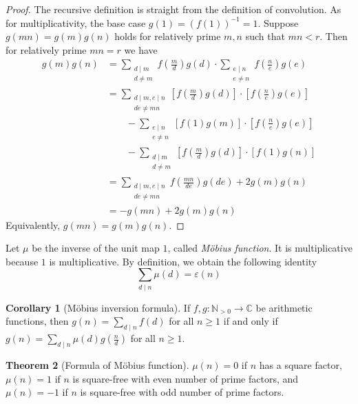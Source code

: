 \documentclass{article}
\theoremstyle{definition}
\newtheorem{theorem}{Theorem}[section]
\newtheorem{corollary}[theorem]{Corollary}
\begin{document}
\begin{proof}
The recursive definition is straight from the definition of convolution. As for multiplicativity, the base case $g(1) = (f(1))^{-1} = 1$. Suppose $g(mn) = g(m) g(n)$ holds for relatively prime $m, n$ such that $mn < r$. Then for relatively prime $mn = r$ we have
\begin{align*}
g(m) g(n) & = \sum_{\substack{d \mid m \\ d \neq m}} f \left( \frac{m}{d} \right) g \left( d \right) \cdot \sum_{\substack{e \mid n \\ e \neq n}} f \left( \frac{n}{e} \right) g \left( e \right)
\\
& = \sum_{\substack{d \mid m, e \mid n \\ de \neq mn}} \left[ f \left( \frac{m}{d} \right) g \left( d \right) \right] \cdot \left[ f \left( \frac{n}{e} \right) g \left( e \right) \right]
\\
& \qquad - \sum_{\substack{e \mid n \\ e \neq n}} \left[ f \left( 1 \right) g \left( m \right) \right] \cdot \left[ f \left( \frac{n}{e} \right) g \left( e \right) \right]
\\
& \qquad - \sum_{\substack{d \mid m \\ d \neq m}} \left[ f \left( \frac{m}{d} \right) g \left( d \right) \right] \cdot \left[ f \left( 1 \right) g \left( n \right) \right]
\\
& = \sum_{\substack{d \mid m, e \mid n \\ de \neq mn}} f \left( \frac{mn}{de} \right) g(de) +  2 g(m) g(n)
\\
& = -g(mn) + 2 g(m) g(n)
\end{align*}
Equivalently, $g(mn) = g(m) g(n)$.
\end{proof}
Let $\mu$ be the inverse of the unit map $1$, called \emph{Möbius function}. It is multiplicative because $1$ is multiplicative. By definition, we obtain the following identity
$$\sum_{d \mid n} \mu(d) = \varepsilon(n)$$
\begin{corollary}[Möbius inversion formula]
If $f, g: \mathbb{N}_{> 0} \to \mathbb{C}$ be arithmetic functions, then $g(n) = \sum_{d \mid n} f(d)$ for all $n \geq 1$ if and only if $g(n) = \sum_{d \mid n} \mu(d) g \left( \frac{n}{d} \right)$ for all $n \geq 1$.
\end{corollary}
\begin{theorem}[Formula of Möbius function]
$\mu(n) = 0$ if $n$ has a square factor, $\mu(n) = 1$ if $n$ is square-free with even number of prime factors, and $\mu(n) = -1$ if $n$ is square-free with odd number of prime factors.
\end{theorem}
\end{document}
